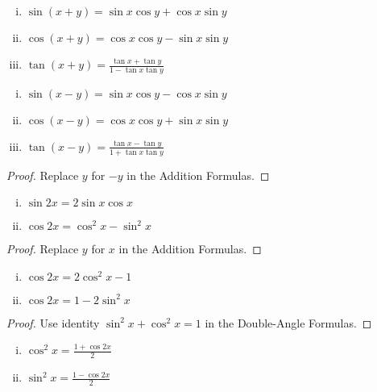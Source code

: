 \documentclass[a4paper,8pt]{article}
\begin{document}
\begin{outline}
    \begin{enumerate}[i.]
      \item \(\sin{(x+y)} = \sin{x}\cos{y} + \cos{x}\sin{y}\)
      \item \(\cos{(x+y)} = \cos{x}\cos{y} - \sin{x}\sin{y}\)
      \item \(\tan{(x+y)} = \frac{\tan{x}+\tan{y}}{1-\tan{x}\tan{y}}\)
    \end{enumerate}

  \pagebreak
    \begin{enumerate}[i.]
      \item \(\sin{(x-y)} = \sin{x}\cos{y} - \cos{x}\sin{y}\)
      \item \(\cos{(x-y)} = \cos{x}\cos{y} + \sin{x}\sin{y}\)
      \item \(\tan{(x-y)} = \frac{\tan{x}-\tan{y}}{1+\tan{x}\tan{y}}\)
    \end{enumerate}

    \begin{proof}
      Replace \(y\) for \(-y\) in the Addition Formulas.
    \end{proof}

    \begin{enumerate}[i.]
      \item \(\sin{2x} = 2\sin{x}\cos{x}\)
      \item \(\cos{2x} = \cos^2 x - \sin^2 x\)
    \end{enumerate}

    \begin{proof}
      Replace \(y\) for \(x\) in the Addition Formulas.
    \end{proof}

    \begin{enumerate}[i.]
      \item \(\cos{2x} = 2\cos^2 x - 1\)
      \item \(\cos{2x} = 1 - 2\sin^2 x\)
    \end{enumerate}

    \begin{proof}
      Use identity \(\sin^2 x + \cos^2 x = 1\) in the Double-Angle Formulas.
    \end{proof}

    \begin{enumerate}[i.]
      \item \(\cos^2 x = \frac{1 + \cos{2x}}{2}\)
      \item \(\sin^2 x = \frac{1 - \cos{2x}}{2}\)
    \end{enumerate}


\end{outline}
\end{document}

